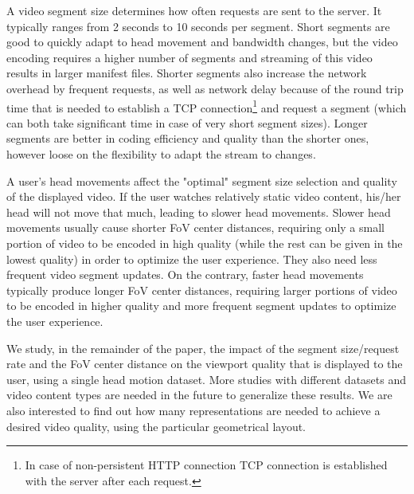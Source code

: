  A video segment size determines how often requests are sent to the server. It typically ranges from 2 seconds to 10 seconds per segment. Short segments are good to quickly adapt to head movement and bandwidth changes, but the video encoding requires a higher number of segments and streaming of this video results in larger manifest files. Shorter segments also increase the network overhead by frequent requests, as well as network delay because of the round trip time that is needed to establish a TCP connection\footnote{In case of non-persistent HTTP connection TCP connection is established with the server after each request.} and request a segment (which can both take significant time in case of very short segment sizes). Longer segments are better in coding efficiency and quality than the shorter ones, however loose on the flexibility to adapt the stream to changes.

A user's head movements affect the "optimal" segment size selection and quality of the displayed video. If the user watches relatively static video content, his/her head will not move that much, leading to slower head movements. Slower head movements usually cause shorter FoV center distances, requiring only a small portion of video to be encoded in high quality (while the rest can be given in the lowest quality) in order to optimize the user experience. They also need less frequent video segment updates. On the contrary, faster head movements typically produce longer FoV center distances,  requiring larger portions of video to be encoded in higher quality and more frequent segment updates to optimize the user experience.

We study, in the remainder of the paper, the impact of the segment size/request rate and the FoV center distance on the viewport quality that is displayed to the user, using a single head motion dataset. More studies with different datasets and video content types are needed in the future to generalize these results. We are also interested to find out how many representations are needed to achieve a desired video quality, using the particular geometrical layout.
